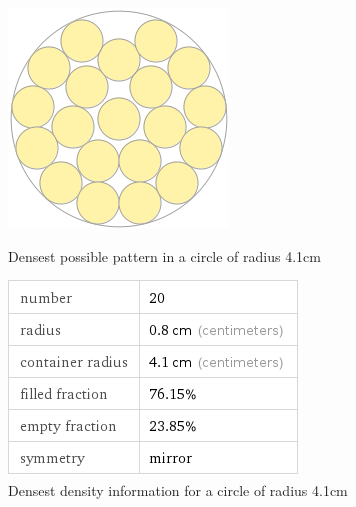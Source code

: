 \begin{figure}[ht!]
\centering

    \begin{minipage}{0.4\textwidth}
    \centering
    \includegraphics[width= \textwidth]{Figures/Packing/DensestPacking_r0.8_R4.1.png}
    \caption{Densest possible pattern in a circle of radius 4.1cm}
    \label{fig:densest4.1}
    \end{minipage}\hfill
    \begin{minipage}{0.4\textwidth}
    \centering
    \includegraphics[width= \textwidth]{Figures/Packing/DensestPacking_r0.8_R4.1_packingPercent.png}
    \caption{Densest density information for a circle of radius 4.1cm}
    \label{fig:densest4.1_packinginfo}
    \end{minipage}
    
\end{figure}

